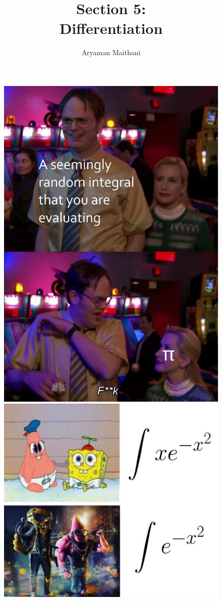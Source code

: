 \documentclass[handout, aspectratio=169]{beamer}
\begin{document}
\begin{frame} 
	\begin{figure}[t]
		\begin{minipage}{0.48\textwidth}
			\centering
			\includegraphics[width=5 cm]{1.jpg}
			
		\end{minipage}
		\begin{minipage}{0.48\textwidth}
			\centering
			\includegraphics[width=5 cm]{15.jpg}
			
		\end{minipage}
	\end{figure}
\end{frame}
\title{Section 5:\\ Differentiation}
\author{ }
\begin{frame} 
	\titlepage
\end{frame}
	\author{Aryaman Maithani}
\end{document}
